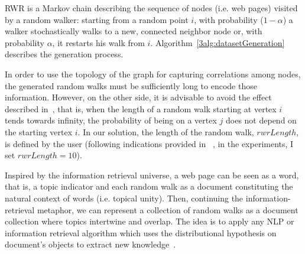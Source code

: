


RWR is a Markov chain describing the sequence of nodes (i.e. web pages) visited by a random walker: starting from a random  point $i$, with probability ($1- \alpha$) a walker stochastically walks to a new, connected neighbor node or, with probability $\alpha$, it restarts his walk from $i$. Algorithm~\ref{3alg:datasetGeneration} describes the generation process.



In order to use the topology of the graph for capturing correlations among nodes, the generated random walks must be sufficiently long to encode those information. However, on the other side, it is advisable to avoid the effect described in~\cite{Pons:2005}, that is, when the length of a random walk starting at vertex $i$ tends towards infinity, the probability of being on a vertex $j$ does not depend on the starting vertex $i$. In our solution, the 
length of the random walk, $rwrLength$, is defined by the user (following indications provided in ~\cite{Pons:2005}, in the experiments, I set $rwrLength = 10$).


Inspired by the information retrieval universe, a web page can be seen as a word, that is, a topic indicator and each random walk as a document constituting the natural context of words (i.e. topical unity).
Then, continuing the information-retrieval metaphor, we can represent a collection of random walks as a document collection where topics intertwine and overlap. The idea is to apply any NLP or information retrieval algorithm which uses the distributional hypothesis on document's objects to extract new knowledge~\cite{Sahlgren:2008}. 



